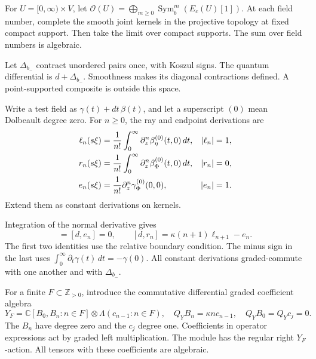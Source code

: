 For \(U=[0,\infty)\times V\), let \(\mathcal
O(U)=\bigoplus_{m\ge0}\operatorname{Sym}_b^m(E_c(U)[1])\). At each field
number, complete the smooth joint kernels in the projective topology at
fixed compact support. Then take the limit over compact supports. The sum
over field numbers is algebraic.

Let \(\Delta_{b_-}\) contract unordered pairs once, with Koszul signs. The
quantum differential is \(d+\Delta_{b_-}\). Smoothness makes its diagonal
contractions defined. A point-supported composite is outside this space.

Write a test field as \(\gamma(t)+dt\,\beta(t)\), and let a superscript
\((0)\) mean Dolbeault degree zero. For \(n\ge0\), the ray and endpoint
derivations are
\begin{align}
 \ell_n(s\xi)&=\frac1{n!}\int_0^\infty
                 \partial_z^n\beta_\eta^{(0)}(t,0)\,dt,
       &|\ell_n|&=1,\notag\\
 r_n(s\xi)&=\frac1{n!}\int_0^\infty
                 \partial_z^n\beta_\Phi^{(0)}(t,0)\,dt,
       &|r_n|&=0,\notag\\
 e_n(s\xi)&=\frac1{n!}\partial_z^n
                    \gamma_\Phi^{(0)}(0,0),
       &|e_n|&=1.
 \label{v4-arith:cs:eq:ray-derivations}
\end{align}
Extend them as constant derivations on kernels.

Integration of the normal derivative gives
\begin{equation}
 [d,\ell_n]=[d,e_n]=0,
 \qquad [d,r_n]=\kappa(n+1)\ell_{n+1}-e_n.
 \label{v4-arith:cs:eq:endpoint-identity}
\end{equation}
The first two identities use the relative boundary condition. The minus sign
in the last uses \(\int_0^\infty\partial_t\gamma(t)\,dt=-\gamma(0)\). All
constant derivations graded-commute with one another and with
\(\Delta_{b_-}\).

For a finite \(F\subset\mathbb Z_{>0}\), introduce the commutative
differential graded coefficient algebra
\begin{equation}
 Y_F=\mathbb C[B_0,B_n:n\in F]
             \otimes\Lambda(c_{n-1}:n\in F),
 \quad
 Q_YB_n=\kappa n c_{n-1},\quad Q_YB_0=Q_Yc_j=0.
 \label{v4-arith:cs:eq:line-coefficients}
\end{equation}
The \(B_n\) have degree zero and the \(c_j\) degree one. Coefficients in
operator expressions act by graded left multiplication. The module has the
regular right \(Y_F\)-action. All tensors with these coefficients are
algebraic.

